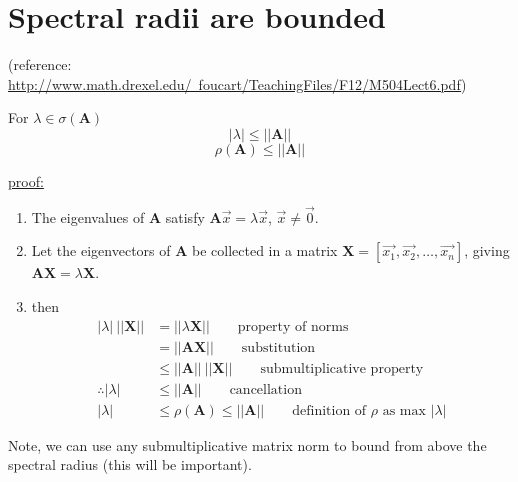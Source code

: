 \documentclass[12pt]{article}
\newcommand{\ve}[1]{\ensuremath{\mathbf{#1}}}
\begin{document}
\section*{Spectral radii are bounded}

(reference: \href{http://www.math.drexel.edu/~foucart/TeachingFiles/F12/M504Lect6.pdf}{http://www.math.drexel.edu/~foucart/TeachingFiles/F12/M504Lect6.pdf})

For $\lambda \in \sigma(\ve{A})$ 
\[|\lambda | \leq ||\ve{A}||\]
\[\rho(\ve{A}) \leq ||\ve{A}||\]

\underline{proof:} 
\begin{enumerate}
\item The eigenvalues of $\ve{A}$ satisfy $\ve{A}\vec{x} = \lambda \vec{x}$, $\vec{x} \neq \vec{0}$. 

\item Let the eigenvectors of $\ve{A}$ be collected in a matrix $\ve{X} = [\vec{x_1}, \vec{x_2}, \dots, \vec{x_n}]$, giving $\ve{AX} = \lambda \ve{X}$.

\item then 
\begin{align}
|\lambda |\: ||\ve{X}|| &= ||\lambda \ve{X}|| 
\qquad \text{property of norms} \nonumber \\
%
                     &= ||\ve{A}\ve{X}|| 
                     \qquad \text{substitution} \nonumber \\
%
                     &\leq ||\ve{A}||\: ||\ve{X}||
                     \qquad \text{submultiplicative property} \nonumber \\
%
\therefore |\lambda | &\leq ||\ve{A}|| 
\qquad \text{cancellation}\nonumber \\
%
|\lambda| &\leq \rho(\ve{A}) \leq ||\ve{A}|| 
\qquad \text{definition of }\rho\text{ as max }|\lambda | \nonumber
\end{align}
\end{enumerate}

Note, we can use any submultiplicative matrix norm to bound from above the spectral radius (this will be important).
\end{document}
